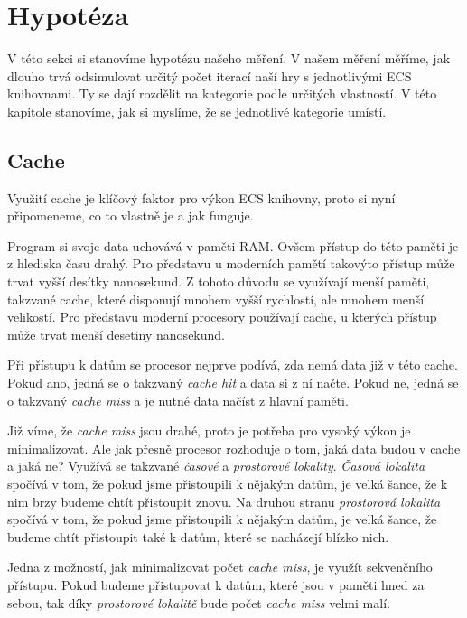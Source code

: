 \section{Hypotéza}
\label{chap:hypothesis}
V této sekci si stanovíme hypotézu našeho měření. V našem měření měříme, jak dlouho trvá odsimulovat určitý počet iterací naší hry s jednotlivými ECS knihovnami. Ty se dají rozdělit na kategorie podle určitých vlastností. V této kapitole stanovíme, jak si myslíme, že se jednotlivé kategorie umístí.


\subsection{Cache}
Využití cache je klíčový faktor pro výkon ECS knihovny, proto si nyní připomeneme, co to vlastně je a jak funguje.

Program si svoje data uchovává v paměti RAM. Ovšem přístup do této paměti je z hlediska času drahý. Pro představu u moderních pamětí takovýto přístup může trvat vyšší desítky nanosekund. Z tohoto důvodu se využívají menší paměti, takzvané cache, které disponují mnohem vyšší rychlostí, ale mnohem menší velikostí. Pro představu moderní procesory používají cache, u kterých přístup může trvat menší desetiny nanosekund.

Při přístupu k datům se procesor nejprve podívá, zda nemá data již v této cache. Pokud ano, jedná se o takzvaný \textit{cache hit} a data si z ní načte. Pokud ne, jedná se o takzvaný \textit{cache miss} a je nutné data načíst z hlavní paměti. 

Již víme, že \textit{cache miss} jsou drahé, proto je potřeba pro vysoký výkon je minimalizovat. Ale jak přesně procesor rozhoduje o tom, jaká data budou v cache a jaká ne? Využívá se takzvané \textit{časové} a \textit{prostorové lokality}. \textit{Časová lokalita} spočívá v tom, že pokud jsme přistoupili k nějakým datům, je velká šance, že k nim brzy budeme chtít přistoupit znovu. Na druhou stranu \textit{prostorová lokalita} spočívá v tom, že pokud jsme přistoupili k nějakým datům, je velká šance, že budeme chtít přistoupit také k datům, které se nacházejí blízko nich.

Jedna z možností, jak minimalizovat počet \textit{cache miss}, je využít sekvenčního přístupu. Pokud budeme přistupovat k datům, které jsou v paměti hned za sebou, tak díky \textit{prostorové lokalitě} bude počet \textit{cache miss} velmi malí.

